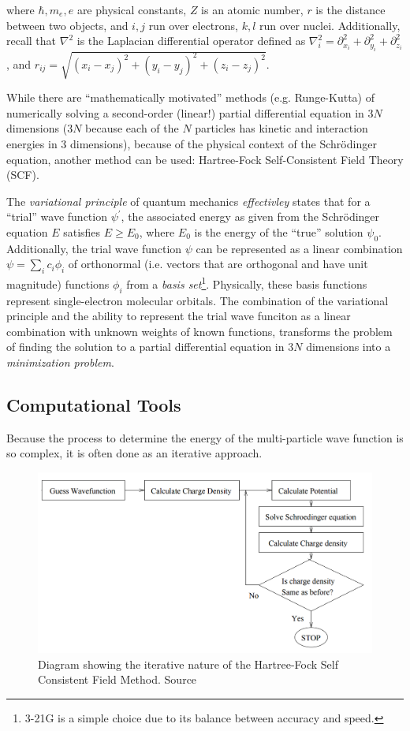 \documentclass{report}
\begin{document}
            where $\hbar, m_e, e$ are physical constants, $Z$ is an atomic number, $r$ is the distance between two objects, and $i,j$ run over electrons, $k,l$ run over nuclei.  Additionally, recall that $\nabla^2$ is the Laplacian differential operator defined as $\nabla_i^2 = \partial_{x_i}^2 + \partial_{y_i}^2 + \partial_{z_i}^2$, and $r_{ij} = \sqrt{(x_i - x_j)^2 + (y_i - y_j)^2 + (z_i - z_j)^2}$.

            While there are ``mathematically motivated'' methods (e.g. Runge-Kutta) of numerically solving a second-order (linear!) partial differential equation in $3N$ dimensions ($3N$ because each of the $N$ particles has kinetic and interaction energies in 3 dimensions), because of the physical context of the Schr{\"o}dinger equation, another method can be used: Hartree-Fock Self-Consistent Field Theory (SCF).

            The \emph{variational principle} of quantum mechanics \textit{effectivley} states that for a ``trial'' wave function $\psi^\prime$, the associated energy as given from the Schr{\"o}dinger equation $E$ satisfies $E \geq E_0$, where $E_0$ is the energy of the ``true'' solution $\psi_0$.  Additionally, the trial wave function $\psi$ can be represented as a linear combination $\psi = \sum_i c_i \phi_i$ of orthonormal (i.e. vectors that are orthogonal and have unit magnitude) functions $\phi_i$ from a \emph{basis set}\footnote{3-21G is a simple choice due to its balance between accuracy and speed\cite{cramer2013essentials}.}.  Physically, these basis functions represent single-electron molecular orbitals.  The combination of the variational principle and the ability to represent the trial wave funciton as a linear combination with unknown weights of known functions, transforms the problem of finding the solution to a partial differential equation in $3N$ dimensions into a \emph{minimization problem}.

        \subsection{Computational Tools}

            Because the process to determine the energy of the multi-particle wave function is so complex, it is often done as an iterative approach.

            \begin{figure}[h]
                \centering
                \includegraphics[width = 0.675\linewidth]{images/hartree_fock.png}
                \caption{Diagram\cite{scf} showing the iterative nature of the Hartree-Fock Self Consistent Field Method. Source}
            \end{figure}
\end{document}
